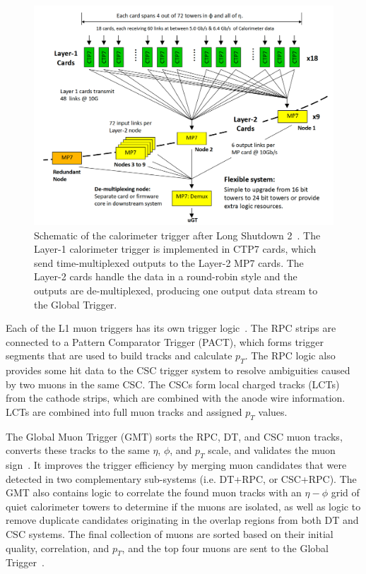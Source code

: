\begin{figure}[ht]
    \centering
    \includegraphics[width=12cm]{figures/ch-2-cern-cms/schematic-run-2-calorimeter-trigger.png}
    \caption[Schematic of the calorimeter trigger after Long Shutdown 2. The Layer-1 calorimeter trigger is implemented in CTP7 cards, which send time-multiplexed outputs to the Layer-2 MP7 cards. The Layer-2 cards handle the data in a round-robin style and the outputs are de-multiplexed, producing one output data stream to the Global Trigger.]{Schematic of the calorimeter trigger after Long Shutdown 2~\cite{CMS-CR-2016-303}. The Layer-1 calorimeter trigger is implemented in CTP7 cards, which send time-multiplexed outputs to the Layer-2 MP7 cards. The Layer-2 cards handle the data in a round-robin style and the outputs are de-multiplexed, producing one output data stream to the Global Trigger.}
    \label{fig:schematic-run-2-calorimeter-trigger}
\end{figure}

Each of the L1 muon triggers has its own trigger logic~\cite{CERN-LHCC-2000-038}. The RPC strips are connected to a Pattern Comparator Trigger (PACT), which forms trigger segments that are used to build tracks and calculate $p_{T}$. The RPC logic also provides some hit data to the CSC trigger system to resolve ambiguities caused by two muons in the same CSC. The CSCs form local charged tracks (LCTs) from the cathode strips, which are combined with the anode wire information. LCTs are combined into full muon tracks and assigned $p_{T}$ values. 

The Global Muon Trigger (GMT) sorts the RPC, DT, and CSC muon tracks, converts these tracks to the same $\eta$, $\phi$, and $p_{T}$ scale, and validates the muon sign~\cite{CERN-LHCC-2000-038}. It improves the trigger efficiency by merging muon candidates that were detected in two complementary sub-systems (i.e. DT+RPC, or CSC+RPC). The GMT also contains logic to correlate the found muon tracks with an $\eta-\phi$ grid of quiet calorimeter towers to determine if the muons are isolated, as well as logic to remove duplicate candidates originating in the overlap regions from both DT and CSC systems. The final collection of muons are sorted based on their initial quality, correlation, and $p_{T}$, and the top four muons are sent to the Global Trigger~\cite{CERN-LHCC-2000-038}. 

